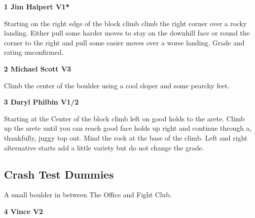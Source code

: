 \begin{multicols}{2}
		
			
			\needspace{1.5cm}
\label{rt:Jim Halpert}
\colorbox{green!20}{
\parbox{0.95\linewidth}{
\textbf{
1 Jim Halpert V1*  \warn\warn
}}}

			\begin{adjustwidth}{0.5cm}{}			
			Starting on the right edge of the block climb climb the right corner over a rocky landing. Either pull some harder moves to stay on the downhill face or round the corner to the right and pull some easier moves over a worse landing. Grade and rating unconfirmed.
			\end{adjustwidth}
			
			
			
			\needspace{1.5cm}
\label{rt:Michael Scott}
\colorbox{green!20}{
\parbox{0.95\linewidth}{
\textbf{
2 Michael Scott V3  \warn
}}}

			\begin{adjustwidth}{0.5cm}{}			
			Climb the center of the boulder using a cool sloper and some pearchy feet.
			\end{adjustwidth}
			
			
			
			\needspace{1.5cm}
\label{rt:Daryl Philbin}
\colorbox{green!20}{
\parbox{0.95\linewidth}{
\textbf{
3 Daryl Philbin V1/2  \warn
}}}

			\begin{adjustwidth}{0.5cm}{}			
			Starting at the Center of the block climb left on good holds to the arete. Climb up the arete until you can reach good face holds up right and continue through a, thankfully, juggy top out. Mind the rock at the base of the climb. Left and right alternative starts add a little variety but do not change the grade.
			\end{adjustwidth}
			
			
		


		\needspace{1.5cm}
		\subsection*{Crash Test Dummies}\label{bf:Crash Test Dummies}
		A small boulder in between The Office and Fight Club.\\
	
		
			
			\needspace{1.5cm}
\label{rt:Vince}
\colorbox{green!20}{
\parbox{0.95\linewidth}{
\textbf{
4 Vince V2  
}}}


\end{multicols}
